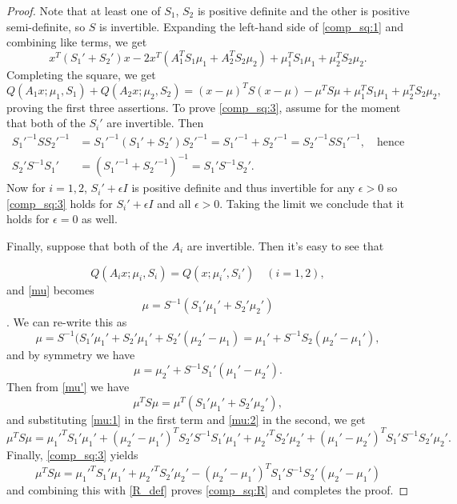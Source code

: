 \documentclass[12pt,leqno]{article}
\begin{document}
\begin{proof}
  Note that at least one of $S_1$, $S_2$ is positive definite and the other is positive semi-definite,
so $S$ is invertible.  Expanding the left-hand side of \eqref{comp_sq:1} and combining
like terms, we get
$$
x^T(S_1'+ S_2')x -2x^T(A_1^TS_1\mu_1+ A_2^TS_2\mu_2) 
+ \mu_1^TS_1\mu_1 + \mu_2^TS_2\mu_2.
$$
Completing the square, we get
$$
Q(A_1x;\mu_1,S_1) + Q(A_2x;\mu_2,S_2) = (x-\mu)^TS(x-\mu) -\mu^TS\mu + \mu_1^TS_1\mu_1 + \mu_2^TS_2\mu_2,
$$
proving the first three assertions.
To prove \eqref{comp_sq:3}, assume for the moment that both of the $S_i'$ are invertible.
Then
\begin{align*}
S_1'^{-1}SS_2'^{-1} &= S_1'^{-1}(S_1'+S_2')S_2'^{-1} = S_1'^{-1}+S_2'^{-1} = S_2'^{-1}SS_1'^{-1},\quad\text{hence}\\
S_2'S^{-1}S_1' &= (S_1'^{-1}+S_2'^{-1})^{-1} = S_1'S^{-1}S_2'.
\end{align*}
Now for $i = 1,2$, $S_i'+\epsilon{I}$ is positive definite and thus invertible for any $\epsilon > 0$
so \eqref{comp_sq:3} holds for $S_i'+\epsilon{I}$ and all $\epsilon > 0$.  Taking the limit
we conclude that it holds for $\epsilon = 0$ as well.

Finally, suppose that both of the $A_i$ are invertible. Then it's easy to see that

$$
Q(A_ix;\mu_i,S_i) = Q(x;\mu_i',S_i')\quad(i = 1,2),
$$
and \eqref{mu} becomes
\begin{equation} \label{mu'}
\mu = S^{-1}(S_1'\mu_1' + S_2'\mu_2')
\end{equation}.
We can re-write this as
\begin{equation}\label{mu:1}
\mu = S^{-1}(S_1'\mu_1' + S_2'\mu_1' + S_2'(\mu_2'-\mu_1) = \mu_1' + S^{-1}S_2(\mu_2'-\mu_1'),
\end{equation}
and by symmetry we have
\begin{equation}\label{mu:2}
  \mu = \mu_2' + S^{-1}S_1'(\mu_1'-\mu_2').
\end{equation}
Then from \eqref{mu'} we have
$$
\mu^TS\mu = \mu^T(S_1'\mu_1' + S_2'\mu_2'),
$$
and substituting \eqref{mu:1} in the first term and \eqref{mu:2} in the second, we get
$$
\mu^TS\mu = \mu_1'^TS_1'\mu_1' + (\mu_2'-\mu_1')^TS_2'S^{-1}S_1'\mu_1' + \mu_2'^TS_2'\mu_2'+(\mu_1'-\mu_2')^TS_1'S^{-1}S_2'\mu_2'.
$$
Finally, \eqref{comp_sq:3} yields
$$
\mu^TS\mu = \mu_1'^TS_1'\mu_1' + \mu_2'^TS_2'\mu_2' - (\mu_2'-\mu_1')^TS_1'S^{-1}S_2'(\mu_2'-\mu_1')
$$
and combining this with \eqref{R_def} proves \eqref{comp_sq:R} and completes the proof.
\end{proof}
\end{document}
